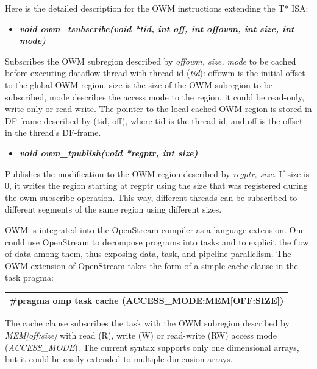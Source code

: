 \documentclass[a4paper]{article}
\begin{document}
{
Here is the detailed description for the OWM instructions extending the
T* ISA:}

\begin{itemize}
\item {\bfseries\itshape
void owm\_tsubscribe(void *tid, int off, int offowm, int size, int
mode)}
\end{itemize}
{
Subscribes the OWM subregion described by \textit{offowm, size, mode} to
be cached before executing dataflow thread with thread id
(\textit{tid}): offowm is the initial offset to the global OWM region,
size is the size of the OWM subregion to be subscribed, mode describes
the access mode to the region, it could be read-only, write-only or
read-write. The pointer to the local cached OWM region is stored in
DF-frame described by (tid, off), where tid is the thread id, and off
is the offset in the thread{\textquoteright}s DF-frame.}

\begin{itemize}
\item {\bfseries\itshape
void owm\_tpublish(void *regptr, int size)}
\end{itemize}
{
Publishes the modification to the OWM region described by
\textit{regptr, size}. If size is 0, it writes the region starting at
regptr using the size that was registered during the owm subscribe
operation. This way, different threads can be subscribed to different
segments of the same region using different sizes.}

{
OWM is integrated into the OpenStream compiler as a language extension.
One could use OpenStream to decompose programs into tasks and to
explicit the flow of data among them, thus exposing data, task, and
pipeline parallelism. The OWM extension of OpenStream takes the form of
a simple cache clause in the task pragma:}

\begin{flushleft}
\tablehead{}
\begin{supertabular}{|m{6.22196in}|}
\hline
{}\ttfamily \#pragma omp task cache
(ACCESS\_MODE:MEM[OFF:SIZE])\\\hline
\end{supertabular}
\end{flushleft}
{
The cache clause subscribes the task with the OWM subregion described by
\textit{MEM[off:size]} with read (R), write (W) or read-write (RW)
access mode (\textit{ACCESS\_MODE}). The current syntax supports only
one dimensional arrays, but it could be easily extended to multiple
dimension arrays. }
\end{document}
